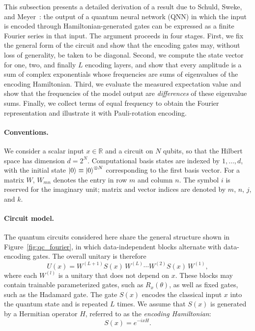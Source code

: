 \documentclass[12pt]{article}
\numberwithin{equation}{section}  %
\begin{document}
This subsection presents a detailed derivation of a result due to Schuld, Sweke, and Meyer~\cite{schuld2021effect}: the output of a quantum neural network (QNN) in which the input is encoded through Hamiltonian-generated gates can be expressed as a finite Fourier series in that input. The argument proceeds in four stages. First, we fix the general form of the circuit and show that the encoding gates may, without loss of generality, be taken to be diagonal. Second, we compute the state vector for one, two, and finally $L$ encoding layers, and show that every amplitude is a sum of complex exponentials whose frequencies are sums of eigenvalues of the encoding Hamiltonian. Third, we evaluate the measured expectation value and show that the frequencies of the model output are \emph{differences} of these eigenvalue sums. Finally, we collect terms of equal frequency to obtain the Fourier representation and illustrate it with Pauli-rotation encoding.

\paragraph{Conventions.} We consider a scalar input $x \in \mathbb{R}$ and a circuit on $N$ qubits, so that the Hilbert space has dimension $d = 2^N$. Computational basis states are indexed by $1, \ldots, d$, with the initial state $\ket{0} \equiv \ket{0}^{\otimes N}$ corresponding to the first basis vector. For a matrix $W$, $W_{mn}$ denotes the entry in row $m$ and column $n$. The symbol $i$ is reserved for the imaginary unit; matrix and vector indices are denoted by $m$, $n$, $j$, and $k$.

\paragraph{Circuit model.} The quantum circuits considered here share the general structure shown in Figure~\ref{fig:qc_fourier}, in which data-independent blocks alternate with data-encoding gates. The overall unitary is therefore
\begin{equation}
U(x) = W^{(L+1)} S(x)\, W^{(L)} \cdots W^{(2)} S(x)\, W^{(1)},
\label{eq:circuit}
\end{equation}
where each $W^{(l)}$ is a unitary that does not depend on $x$. These blocks may contain trainable parameterized gates, such as $R_x(\theta)$, as well as fixed gates, such as the Hadamard gate. The gate $S(x)$ encodes the classical input $x$ into the quantum state and is repeated $L$ times. We assume that $S(x)$ is generated by a Hermitian operator $H$, referred to as the \emph{encoding Hamiltonian}:
\begin{equation}
S(x) = e^{-ixH}.
\label{eq:encoding}
\end{equation}
\end{document}
